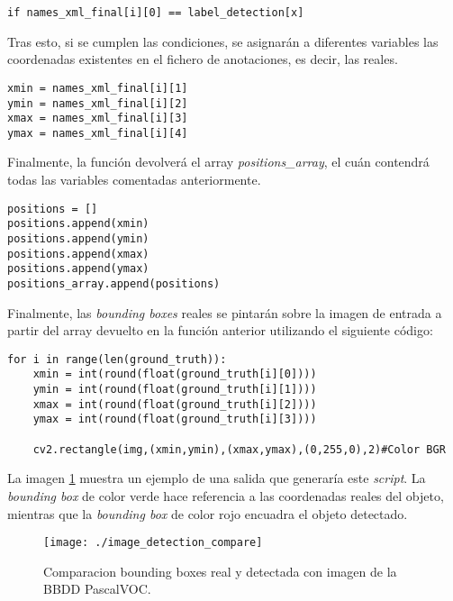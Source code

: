 \documentclass[a4paper, 12pt, spanish, chapterprefix, numbers=noenddot]{book}
\begin{document}
\begin{lstlisting}[frame=single]
if names_xml_final[i][0] == label_detection[x]
\end{lstlisting}

Tras esto, si se cumplen las condiciones, se asignarán a diferentes variables las coordenadas existentes en el fichero de anotaciones, es decir, las reales.\\

\begin{lstlisting}[frame=single]
xmin = names_xml_final[i][1]
ymin = names_xml_final[i][2]
xmax = names_xml_final[i][3]
ymax = names_xml_final[i][4]
\end{lstlisting}

Finalmente, la función devolverá el array \textit{positions\_array}, el cuán contendrá todas las variables comentadas anteriormente.\\

\begin{lstlisting}[frame=single]
positions = []
positions.append(xmin)
positions.append(ymin)
positions.append(xmax)
positions.append(ymax)
positions_array.append(positions)
\end{lstlisting}

Finalmente, las \textit{bounding boxes} reales se pintarán sobre la imagen de entrada a partir del array devuelto en la función anterior utilizando el siguiente código:\\

\begin{lstlisting}[frame=single]
for i in range(len(ground_truth)):
	xmin = int(round(float(ground_truth[i][0])))
	ymin = int(round(float(ground_truth[i][1])))
	xmax = int(round(float(ground_truth[i][2])))
	ymax = int(round(float(ground_truth[i][3])))

	cv2.rectangle(img,(xmin,ymin),(xmax,ymax),(0,255,0),2)#Color BGR
\end{lstlisting}

La imagen \ref{DetectionCompare} muestra un ejemplo de una salida que generaría este \textit{script}. La \textit{bounding box} de color verde hace referencia a las coordenadas reales del objeto, mientras que la \textit{bounding box} de color rojo encuadra el objeto detectado.\\

\begin{figure}[H]
\begin{center}
\texttt{[image: ./image\_detection\_compare]}
\caption{Comparacion bounding boxes real y detectada con imagen de la BBDD PascalVOC.}
\label{DetectionCompare}
\end{center}
\end{figure}
\end{document}
